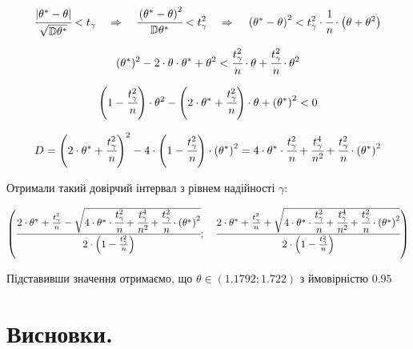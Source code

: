 \documentclass[a5paper, 20pt]{article}
\begin{document}
$$ \cfrac{|\theta^*-\theta|}{\sqrt{\mathbb{D} \theta^*}} < t_{\gamma} \quad \Rightarrow{} \quad \cfrac{\left( \theta^* - \theta \right)^2}{\mathbb{D} \theta^*} < t_{\gamma}^2 \quad \Rightarrow{} \quad \left( \theta^* - \theta \right)^2 < t_{\gamma}^2 \cdot \cfrac{1}{n}\cdot \left(\theta + \theta^2 \right)$$

$$ (\theta^*)^2 - 2 \cdot \theta \cdot \theta^* + \theta^2 < \cfrac{t_{\gamma}^2}{n} \cdot \theta + \cfrac{t_{\gamma}^2}{n} \cdot \theta^2$$

$$ \left( 1 - \cfrac{t_{\gamma}^2}{n} \right)\cdot \theta^2 - \left( 2 \cdot \theta^* + \cfrac{t_{\gamma}^2}{n} \right) \cdot \theta+ \left( \theta^* \right)^2  < 0 $$

$$ D = \left( 2 \cdot \theta^* + \cfrac{t_{\gamma}^2}{n} \right)^2 - 4 \cdot  \left( 1 - \cfrac{t_{\gamma}^2}{n} \right) \cdot  \left( \theta^* \right)^2 =
4 \cdot \theta^* \cdot \cfrac{t_{\gamma}^2}{n} +\cfrac{t_{\gamma}^4}{n^2} + \cfrac{t_{\gamma}^2}{n} \cdot \left( \theta^* \right)^2$$

\vspace{4mm}

Отримали такий довірчий інтервал з рівнем надійності $\gamma$:

$$ \left( \cfrac{2 \cdot \theta^* + \frac{t_{\gamma}^2}{n} - \sqrt{4 \cdot \theta^* \cdot \cfrac{t_{\gamma}^2}{n} +\cfrac{t_{\gamma}^4}{n^2} + \cfrac{t_{\gamma}^2}{n} \cdot \left( \theta^* \right)^2}}{2 \cdot \left(1 - \frac{t_{\gamma}^2}{n} \right)} ; \quad \cfrac{2 \cdot \theta^* + \frac{t_{\gamma}^2}{n} + \sqrt{4 \cdot \theta^* \cdot \cfrac{t_{\gamma}^2}{n} +\cfrac{t_{\gamma}^4}{n^2} + \cfrac{t_{\gamma}^2}{n} \cdot \left( \theta^* \right)^2}}{2 \cdot \left( 1 - \frac{t_{\gamma}^2}{n} \right)}  \right) $$

\vspace{4mm}

Підставивши значення отримаємо, що $ \theta \in (1.1792; 1.722) $ з ймовірністю $0.95$


\section{Висновки.}
\end{document}
